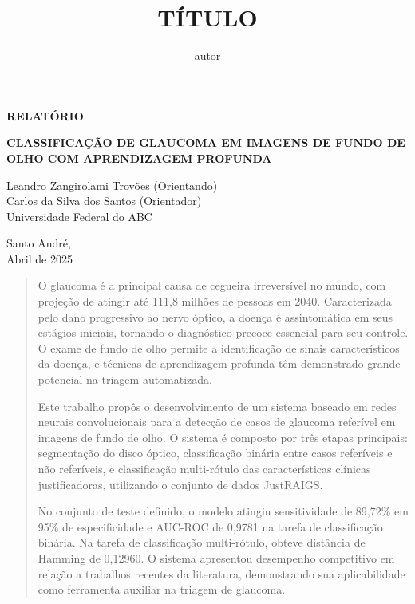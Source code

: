 \documentclass[12pt]{article}
\title{TÍTULO}
\author{autor}
\begin{document}
\thispagestyle{empty}
    \begin{flushright}
        \begin{huge}
            \textbf{RELATÓRIO}\\[3,5cm]
        \end{huge}
{\bf \LARGE  CLASSIFICAÇÃO DE GLAUCOMA EM IMAGENS DE FUNDO DE OLHO COM APRENDIZAGEM PROFUNDA}

\bigskip
        
        Leandro Zangirolami Trovões (Orientando)\\
        Carlos da Silva dos Santos (Orientador)\\
        Universidade Federal do ABC\\[5,5cm]
    \end{flushright}

    \vfill
    
    \begin{center}
        Santo André,\\
        Abril de 2025
    \end{center}
    
    \newpage
\bigskip

\begin{center}
\end{center}

\begin{quote}
O glaucoma é a principal causa de cegueira irreversível no mundo, com projeção de atingir até 111,8 milhões de pessoas em 2040. Caracterizada pelo dano progressivo ao nervo óptico, a doença é assintomática em seus estágios iniciais, tornando o diagnóstico precoce essencial para seu controle. O exame de fundo de olho permite a identificação de sinais característicos da doença, e técnicas de aprendizagem profunda têm demonstrado grande potencial na triagem automatizada.

Este trabalho propôs o desenvolvimento de um sistema baseado em redes neurais convolucionais para a detecção de casos de glaucoma referível em imagens de fundo de olho. O sistema é composto por três etapas principais: segmentação do disco óptico, classificação binária entre casos referíveis e não referíveis, e classificação multi-rótulo das características clínicas justificadoras, utilizando o conjunto de dados JustRAIGS.

No conjunto de teste definido, o modelo atingiu sensitividade de 89,72\% em 95\% de especificidade e AUC-ROC de 0,9781 na tarefa de classificação binária. Na tarefa de classificação multi-rótulo, obteve distância de Hamming de 0,12960. O sistema apresentou desempenho competitivo em relação a trabalhos recentes da literatura, demonstrando sua aplicabilidade como ferramenta auxiliar na triagem de glaucoma.
\end{quote}
\end{document}
